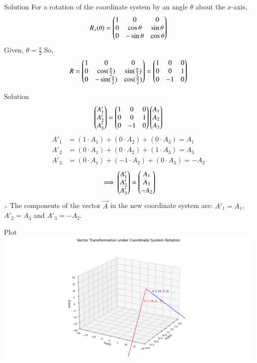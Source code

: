 \documentclass{beamer}
\begin{document}
\begin{frame}{Solution}
For a rotation of the coordinate system by an angle $\theta$ about the $x$-axis, 
\begin{align}
    R_x(\theta) = \begin{pmatrix}1 & 0 & 0 \\ 0 & \cos\theta & \sin\theta \\ 0 & -\sin\theta & \cos\theta\end{pmatrix}  
\end{align}
Given, $\theta = \frac{\pi}{2}$.So,
\begin{align}    
R = \begin{pmatrix} 1 & 0 & 0 \\ 0 & \cos(\frac{\pi}{2}) & \sin(\frac{\pi}{2}) \\ 0 & -\sin(\frac{\pi}{2}) & \cos(\frac{\pi}{2})\end{pmatrix}   = \begin{pmatrix} 1 & 0 & 0 \\ 0 & 0 & 1 \\ 0 & -1 & 0\end{pmatrix}  
\end{align}
\end{frame}
\begin{frame}{Solution}
\begin{align}
    \begin{pmatrix}A'_1 \\ A'_2 \\ A'_3\end{pmatrix}  = \begin{pmatrix}1 & 0 & 0 \\ 0 & 0 & 1 \\ 0 & -1 & 0\end{pmatrix}   \begin{pmatrix} A_1 \\ A_2 \\ A_3\end{pmatrix}  
\end{align}
\begin{align}
A'_1 &= (1 \cdot A_1) + (0 \cdot A_2) + (0 \cdot A_3) = A_1 \\
A'_2 &= (0 \cdot A_1) + (0 \cdot A_2) + (1 \cdot A_3) = A_3 \\
A'_3 &= (0 \cdot A_1) + (-1 \cdot A_2) + (0 \cdot A_3) = -A_2
\end{align}
\begin{align}
\implies \begin{pmatrix}A'_1 \\ A'_2 \\ A'_3\end{pmatrix} =\begin{pmatrix} A_1 \\ A_3 \\ -A_2\end{pmatrix} 
\end{align}
$\therefore$ The components of the vector $\vec{A}$ in the new coordinate system are:
$A'_1 = A_1$, $A'_2 = A_3$ and $A'_3 = -A_2$.
\end{frame}
\begin{frame}{Plot}
    \centering
    \includegraphics[width=\columnwidth, height=1\textheight, keepaspectratio]{figs/fig1.png} 
\end{frame}
\end{document}
